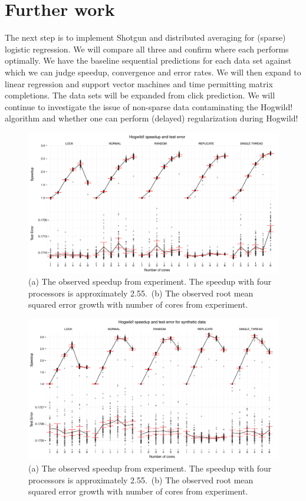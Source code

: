 \documentclass{article} %
\begin{document}
\section{Further work}
The next step is to implement Shotgun and distributed averaging for (sparse) logistic regression. We will compare all three and confirm where each performs optimally. We have the baseline sequential predictions for each data set against which we can judge speedup, convergence and error rates. We will then expand to linear regression and support vector machines and time permitting matrix completions. The data sets will be expanded from click prediction. We will continue to investigate the issue of non-sparse data contaminating the Hogwild! algorithm and whether one can perform (delayed) regularization during Hogwild!

\begin{figure}[htb]
\centering
\includegraphics[width=\textwidth]{../../speedup_errors_complete.pdf}
\caption{(a) The observed speedup from experiment. The speedup with four processors is approximately 2.55.~(b) The observed root mean squared error growth with number of cores from experiment.}
\label{res}
\end{figure}

\begin{figure}[htb]
\centering
\includegraphics[width=\textwidth]{../../speedup_errors_complete_syn.pdf}
\caption{(a) The observed speedup from experiment. The speedup with four processors is approximately 2.55.~(b) The observed root mean squared error growth with number of cores from experiment.}
\label{res}
\end{figure}
\end{document}
